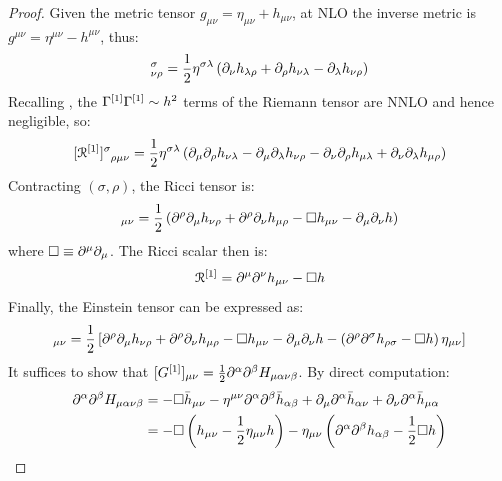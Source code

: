 \begin{proofbox}
  \begin{proof}
    Given the metric tensor $ g_{\mu \nu} = \eta_{\mu \nu} + h_{\mu \nu} $, at NLO the inverse metric is $ g^{\mu \nu} = \eta^{\mu \nu} - h^{\mu \nu} $, thus:
    \begin{equation*}
      [\Gamma\od1]^\sigma_{\nu \rho} = \frac{1}{2} \eta^{\sigma \lambda} \left( \pa_\nu h_{\lambda \rho} + \pa_\rho h_{\nu \lambda} - \pa_\lambda h_{\nu \rho} \right)
    \end{equation*}
    Recalling , the $ \Gamma^{[1]} \Gamma^{[1]} \sim h^2 $ terms of the Riemann tensor are NNLO and hence negligible, so:
    \begin{equation*}
      \tensor{[\rr\od1]}{^\sigma_{\rho \mu \nu}} = \frac{1}{2} \eta^{\sigma \lambda} \left( \pa_\mu \pa_\rho h_{\nu \lambda} - \pa_\mu \pa_\lambda h_{\nu \rho} - \pa_\nu \pa_\rho h_{\mu \lambda} + \pa_\nu \pa_\lambda h_{\mu \rho} \right)
    \end{equation*}
    Contracting $ (\sigma,\rho) $, the Ricci tensor is:
    \begin{equation*}
      [\rr\od1]_{\mu \nu} = \frac{1}{2} \left( \pa^\rho \pa_\mu h_{\nu \rho} + \pa^\rho \pa_\nu h_{\mu \rho} - \dal h_{\mu \nu} - \pa_\mu \pa_\nu h \right)
    \end{equation*}
    where $ \Box \equiv \partial^\mu \partial_\mu $. The Ricci scalar then is:
    \begin{equation*}
      \EuScript{R}^{[1]} = \partial^\mu \partial^\nu h_{\mu \nu} - \Box h
    \end{equation*}
    Finally, the Einstein tensor can be expressed as:
    \begin{equation*}
      [G\od1]_{\mu \nu} = \frac{1}{2} \left[ \pa^\rho \pa_\mu h_{\nu \rho} + \pa^\rho \pa_\nu h_{\mu \rho} - \dal h_{\mu \nu} - \pa_\mu \pa_\nu h - \left( \pa^\rho \pa^\sigma h_{\rho \sigma} - \dal h \right) \eta_{\mu \nu} \right]
    \end{equation*}
    It suffices to show that $ [G^{[1]}]_{\mu \nu} = \frac{1}{2} \partial^\alpha \partial^\beta H_{\mu \alpha \nu \beta} $. By direct computation:
    \begin{equation*}
      \begin{split}
        \pa^\alpha \pa^\beta H_{\mu \alpha \nu \beta}
        & = - \dal \bar{h}_{\mu \nu} - \eta^{\mu \nu} \pa^\alpha \pa^\beta \bar{h}_{\alpha \beta} + \pa_\mu \pa^\alpha \bar{h}_{\alpha \nu} + \pa_\nu \pa^\alpha \bar{h}_{\mu \alpha} \\
        & = - \dal \left( h_{\mu \nu} - \frac{1}{2} \eta_{\mu \nu} h \right) - \eta_{\mu \nu} \left( \pa^\alpha \pa^\beta h_{\alpha \beta} - \frac{1}{2} \dal h \right) \\

\end{split}
\end{equation*}
\end{proof}
\end{proofbox}
